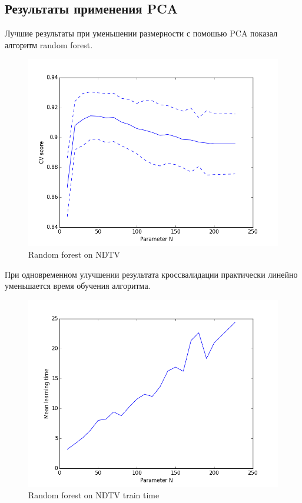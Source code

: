 \begin{Отбор признаков}
\begin{PCA}
 \subsection*{Результаты применения PCA}
 \begin{Результаты применения PCA}
 Лучшие результаты при уменьшении размерности с помошью PCA показал алгоритм random forest.
 \begin{figure} \centering \includegraphics[width=1\textwidth]{images/randforest_NDTV_PCA.png} \caption{Random forest on NDTV } \label{fig:image} \end{figure}
 При одновременном улучшении результата кроссвалидации практически линейно уменьшается время обучения алгоритма.
  \begin{figure} \centering \includegraphics[width=1\textwidth]{images/randforest_NDTV_PCA_time.png} \caption{Random forest on NDTV train time} \label{fig:image} \end{figure}

\end{Результаты применения PCA}
\end{PCA}
\end{Отбор признаков}
